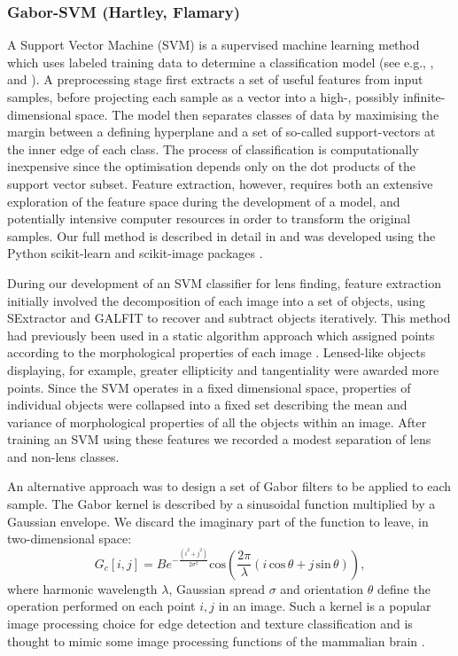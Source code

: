 \documentclass{aa}
\begin{document}
\subsubsection{Gabor-SVM (Hartley, Flamary)}

A Support Vector Machine (SVM) is a supervised machine learning method which uses labeled training data to determine a classification model (see e.g., \citet{vapnik79estimation}, \citet{Cortes1995} and \citet{Burges1998}). A preprocessing stage first extracts a set of useful features from input samples, before projecting each sample as a vector into a high-, possibly infinite-dimensional space. The model then separates classes of data by maximising the margin between a defining hyperplane and a set of so-called support-vectors at the inner edge of each class. The process of classification is computationally inexpensive since the optimisation depends only on the dot products of the support vector subset. Feature extraction, however,  requires both an extensive exploration of the feature space during the development of a model, and potentially intensive computer resources in order to transform the original samples. Our full method is described in detail in \citet{hartley2017support} and was developed using the Python scikit-learn and scikit-image packages \citep{scikit-learn,scikit-image}.

During our development of an SVM classifier for lens finding, feature extraction initially involved the decomposition of each image into a set of objects, using SExtractor \citep{1996AandAS..117..393B} and GALFIT \citep{2002AJ...124..266P} to recover and subtract objects iteratively. This method had previously been used in a static algorithm approach which assigned points according to the morphological properties of each image \citep[see][]{2014AandA...566A..63J}. Lensed-like objects displaying, for example, greater ellipticity and tangentiality were awarded more points. Since the SVM operates in a fixed dimensional space,  properties of individual objects were collapsed into a fixed set describing the mean and variance of morphological properties of all the objects within an image. After training an SVM using these features we recorded a modest separation of lens and non-lens classes.

An alternative approach was to design a set of Gabor filters to be applied to each sample. The Gabor kernel is described by a sinusoidal function multiplied by a Gaussian envelope. We discard the imaginary part of the function to leave, in two-dimensional space:
\begin{equation}
G_c[i,j]=Be^{-\frac{(i^2+j^2)}{2\sigma^2}} \mathrm{cos}\left(\frac{2\pi}{\lambda} (i\, \mathrm{cos} \, \theta + j\, \mathrm{sin} \,\theta)\right),
\end{equation}
where harmonic wavelength $\lambda$, Gaussian spread  $\sigma$ and orientation $\theta$ define the operation performed on each point $i,j$ in an image. Such a kernel is a popular image processing choice for edge detection and texture classification \citep[e.g.][]{Feichtinger98a,Springer-verlag97computationalmodels} and is thought to mimic some image processing functions of the mammalian brain \citep{Jones1233}.
\end{document}
